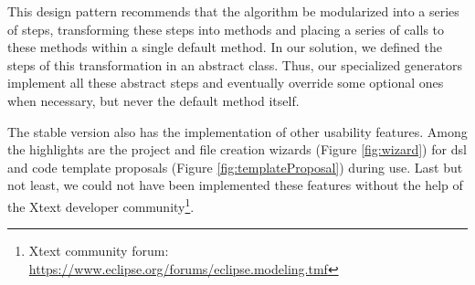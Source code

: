 This design pattern recommends that the algorithm be modularized into a series of steps, transforming these steps into methods and placing a series of calls to these methods within a single default method.
In our solution, we defined the steps of this transformation in an abstract class.
Thus, our specialized generators implement all these abstract steps and eventually override some optional ones when necessary, but never the default method itself.

%     

The stable version also has the implementation of other usability features.
Among the highlights are the project and file creation wizards (Figure \ref{fig:wizard}) for \ac{dsl} and code template proposals (Figure \ref{fig:templateProposal}) during use.
Last but not least, we could not have been implemented these features without the help of the Xtext developer community\footnote{Xtext community forum: \url{https://www.eclipse.org/forums/eclipse.modeling.tmf}}.

